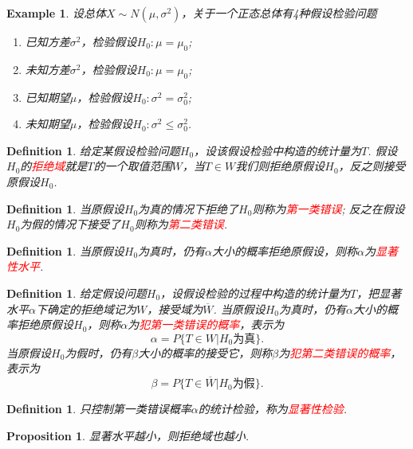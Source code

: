 \documentclass{article}
\newtheorem{proposition}[theorem]{Proposition}
\newtheorem{example}[theorem]{Example}
\newtheorem{definition}[theorem]{Definition}
\newcommand{\redt}[1]{\textcolor{red}{#1}}
\begin{document}
\begin{example}
\rm 设总体$X \sim N(\mu,\sigma^2)$，关于一个正态总体有4种假设检验问题
\begin{enumerate}
	\item 已知方差$\sigma^2$，检验假设$H_0: \mu = \mu_0$;
	\item 未知方差$\sigma^2$，检验假设$H_0: \mu = \mu_0$;
	\item 已知期望$\mu$，检验假设$H_0: \sigma^2 = \sigma_0^2$;
	\item 未知期望$\mu$，检验假设$H_0: \sigma^2 \leq \sigma_0^2$.
\end{enumerate}
\end{example}


\begin{definition}
\rm 给定某假设检验问题$H_0$，设该假设检验中构造的统计量为$T$. 假设$H_0$的\redt{拒绝域}就是$T$的一个取值范围$W$，当$T \in W$我们则拒绝原假设$H_0$，反之则接受原假设$H_0$. 
\end{definition}

\begin{definition}
\rm 当原假设$H_0$为真的情况下拒绝了$H_0$则称为\redt{第一类错误}; 反之在假设$H_0$为假的情况下接受了$H_0$则称为\redt{第二类错误}.
\end{definition}

\begin{definition}
\rm 当原假设$H_0$为真时，仍有$\alpha$大小的概率拒绝原假设，则称$\alpha$为\redt{显著性水平}.  
\end{definition}

\begin{definition}
\rm 给定假设问题$H_0$，设假设检验的过程中构造的统计量为$T$，把显著水平$\alpha$下确定的拒绝域记为$W$，接受域为$\overline{W}$. 当原假设$H_0$为真时，仍有$\alpha$大小的概率拒绝原假设$H_0$，则称$\alpha$为\redt{犯第一类错误的概率}，表示为
$$
\alpha = P\{T \in W|H_0\text{为真}\}. 
$$
当原假设$H_0$为假时，仍有$\beta$大小的概率的接受它，则称$\beta$为\redt{犯第二类错误的概率}，表示为
$$
\beta = P\{T \in \overline{W} | H_0\text{为假}\}. 
$$  
\end{definition}

\begin{definition}
\rm 只控制第一类错误概率$\alpha$的统计检验，称为\redt{显著性检验}.
\end{definition}

\begin{proposition}
\rm 显著水平越小，则拒绝域也越小. 
\end{proposition}
\end{document}
